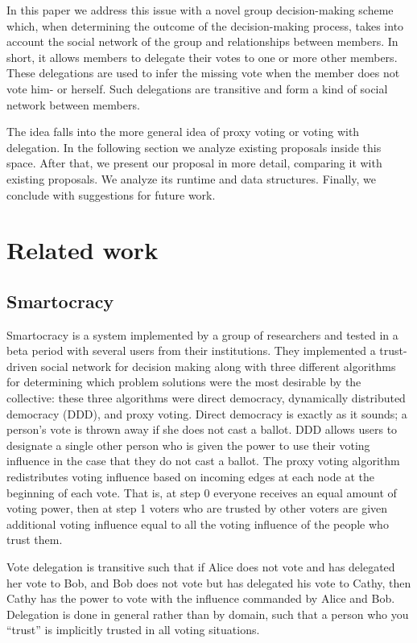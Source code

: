 \documentclass[a4paper]{acm_proc_article-sp}
\begin{document}
In this paper we address this issue with a novel group decision-making scheme which, when determining the outcome of
the decision-making process, takes into account the social network of the group and relationships between members.
In short, it allows members to delegate their votes to one or more other members. These delegations are used to infer
the missing vote when the member does not vote him- or herself. Such delegations are transitive and form a kind of
social network between members.

The idea falls into the more general idea of proxy voting or voting with delegation.  In the following section we
analyze existing proposals inside this space. After that, we present our proposal in more detail, comparing it with
existing proposals.  We analyze its runtime and data structures.  Finally, we conclude with suggestions for future work.

\section{Related work}

\subsection{Smartocracy}

Smartocracy is a system implemented by a group of researchers and tested in a beta period with several users from their
institutions.  They implemented a trust-driven social network for decision making along with three different algorithms
for determining which problem solutions were the most desirable by the collective: these three algorithms were direct
democracy, dynamically distributed democracy (DDD), and proxy voting.  Direct democracy is exactly as it sounds;
a person's vote is thrown away if she does not cast a ballot.  DDD allows users to designate a single other person
who is given the power to use their voting influence in the case that they do not cast a ballot.  The proxy voting
algorithm redistributes voting influence based on incoming edges at each node at the beginning of each vote.  That
is, at step 0 everyone receives an equal amount of voting power, then at step 1 voters who are trusted by other
voters are given additional voting influence equal to all the voting influence of the people who trust them.

Vote delegation is transitive such that if Alice does not vote and has delegated her vote to Bob, and Bob does not
vote but has delegated his vote to Cathy, then Cathy has the power to vote with the influence commanded by Alice and Bob.
Delegation is done in general rather than by domain, such that a person who you ``trust'' is implicitly trusted in all
voting situations.
\end{document}
